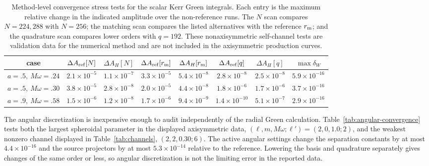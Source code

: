 \documentclass[aps,prd,twocolumn,10pt,nofootinbib,superscriptaddress,floatfix]{revtex4-2}
\begin{document}
\begin{table}[t]
\caption{Method-level convergence stress tests for the scalar Kerr Green
integrals.  Each entry is the maximum relative change in the indicated
amplitude over the non-reference runs.  The $N$ scan compares $N=224,288$ with
$N=256$; the matching scan compares the listed alternatives with the reference
$r_{\rm m}$; and the quadrature scan compares lower orders with $q=192$.
These nonaxisymmetric self-channel tests are validation data for the numerical
method and are not included in the axisymmetric production curves.}
\label{tab:convergence}
\begin{ruledtabular}
\begin{tabular}{c c c c c c c c}
case & $\Delta A_{\rm ref}[N]$ & $\Delta A_H[N]$
& $\Delta A_{\rm ref}[r_{\rm m}]$ & $\Delta A_H[r_{\rm m}]$
& $\Delta A_{\rm ref}[q]$ & $\Delta A_H[q]$ & $\max\delta_W$\\
\hline
$a=.5,\ M\omega=.24$ & $2.1\times10^{-5}$ & $1.1\times10^{-7}$
& $3.3\times10^{-5}$ & $5.4\times10^{-8}$ & $2.8\times10^{-8}$
& $2.5\times10^{-8}$ & $5.9\times10^{-16}$\\
$a=.5,\ M\omega=.30$ & $3.8\times10^{-5}$ & $2.8\times10^{-8}$
& $2.0\times10^{-5}$ & $4.4\times10^{-8}$ & $1.8\times10^{-6}$
& $1.7\times10^{-6}$ & $3.7\times10^{-16}$\\
$a=.9,\ M\omega=.58$ & $1.5\times10^{-6}$ & $1.2\times10^{-8}$
& $1.7\times10^{-6}$ & $9.4\times10^{-9}$ & $1.4\times10^{-10}$
& $5.1\times10^{-7}$ & $2.9\times10^{-16}$\\
\end{tabular}
\end{ruledtabular}
\end{table}

The angular discretization is inexpensive enough to audit independently of the
radial Green calculation.  Table~\ref{tab:angular-convergence} tests both the
largest spheroidal parameter in the displayed axisymmetric data,
$(\ell,m,M\omega;\ell')=(2,0,1.0;2)$, and the weakest nonzero channel displayed
in Table~\ref{tab:channels}, $(2,2,0.30;6)$.  The active angular settings change
the separation constants by at most $4.4\times10^{-16}$ and the source
projectors by at most $5.3\times10^{-14}$ relative to the reference.  Lowering
the basis and quadrature separately gives changes of the same order or less,
so angular discretization is not the limiting error in the reported data.
\end{document}
